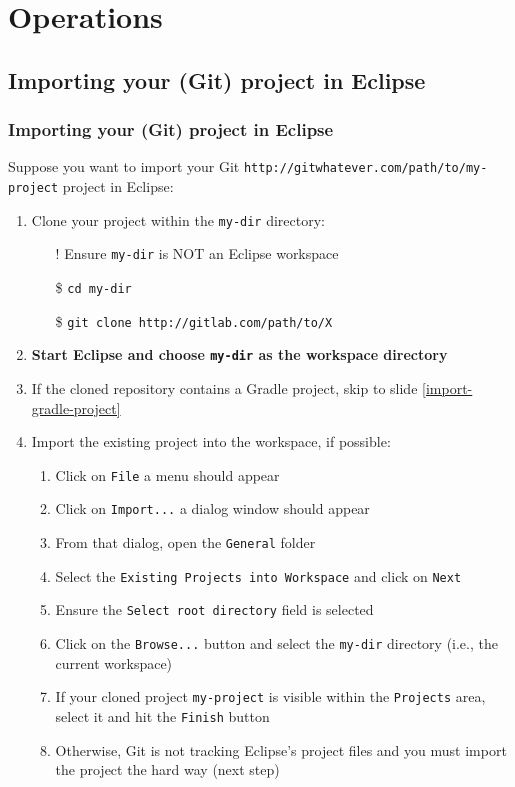 \documentclass[handout]{beamer}\mode<presentation>{\usetheme{AMSCesenaPurpleAndGold}}
\begin{document}
\section{Operations}

\subsection{Importing your (Git) project in Eclipse}

\begin{frame}[allowframebreaks]
\frametitle{Importing your (Git) project in Eclipse} 
    Suppose you want to import your Git \texttt{http://gitwhatever.com/path/to/\alert{my-project}} project in Eclipse:
    \begin{enumerate}
        \item Clone your project within the \texttt{\alert{my-dir}} directory:
        \begin{itemize}
            \item[!] Ensure \texttt{my-dir} is NOT an Eclipse workspace
            \item[\$] \texttt{cd \alert{my-dir}}
            \item[\$] \texttt{git clone http://gitlab.com/path/to/X} 
        \end{itemize}
        
        \item \textbf{Start Eclipse and choose \texttt{\alert{my-dir}} as the workspace directory}
        
        \item If the cloned repository contains a Gradle project, skip to slide \ref{import-gradle-project}
        
        \item Import the existing project into the workspace, if possible:
        \begin{enumerate}
            \item Click on \texttt{File} a menu should appear
            \item Click on \texttt{Import...} a dialog window should appear
            \item From that dialog, open the \texttt{General} folder
            \item Select the \texttt{Existing Projects into Workspace} and click on \texttt{Next}
            \item Ensure the \texttt{Select root directory} field is selected
            \item Click on the \texttt{Browse...} button and select the \texttt{\alert{my-dir}} directory (i.e.,  the current workspace)
            \item If your cloned project \texttt{\alert{my-project}} is visible within the \texttt{Projects} area, select it and hit the \texttt{Finish} button
            \item Otherwise, Git is not tracking Eclipse's project files and you must import the project the hard way (next step)
        \end{enumerate}
        

\end{enumerate}
\end{frame}
\end{document}
